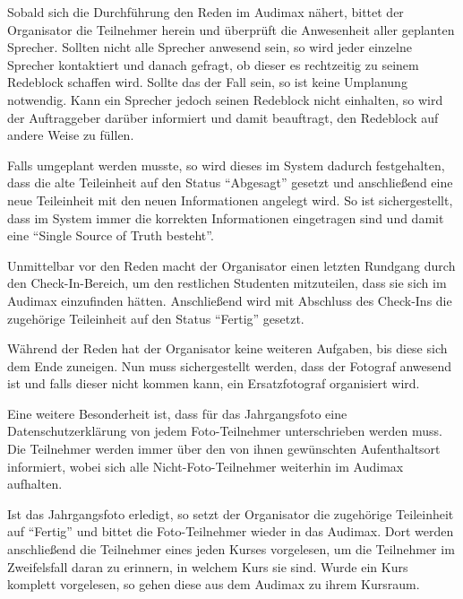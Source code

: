 

Sobald sich die Durchführung den Reden im Audimax nähert, bittet der Organisator die Teilnehmer herein und überprüft die Anwesenheit aller geplanten Sprecher. Sollten nicht alle Sprecher anwesend sein, so wird jeder einzelne Sprecher kontaktiert und danach gefragt, ob dieser es rechtzeitig zu seinem Redeblock schaffen wird. Sollte das der Fall sein, so ist keine Umplanung notwendig. Kann ein Sprecher jedoch seinen Redeblock nicht einhalten, so wird der Auftraggeber darüber informiert und damit beauftragt, den Redeblock auf andere Weise zu füllen.

Falls umgeplant werden musste, so wird dieses im System dadurch festgehalten, dass die alte Teileinheit auf den Status \enquote{Abgesagt} gesetzt und anschließend eine neue Teileinheit mit den neuen Informationen angelegt wird. So ist sichergestellt, dass im System immer die korrekten Informationen eingetragen sind und damit eine \enquote{Single Source of Truth besteht}.

Unmittelbar vor den Reden macht der Organisator einen letzten Rundgang durch den Check-In-Bereich, um den restlichen Studenten mitzuteilen, dass sie sich im Audimax einzufinden hätten. Anschließend wird mit Abschluss des Check-Ins die zugehörige Teileinheit auf den Status \enquote{Fertig} gesetzt.



Während der Reden hat der Organisator keine weiteren Aufgaben, bis diese sich dem Ende zuneigen. Nun muss sichergestellt werden, dass der Fotograf anwesend ist und falls dieser nicht kommen kann, ein Ersatzfotograf organisiert wird. 

Eine weitere Besonderheit ist, dass für das Jahrgangsfoto eine Datenschutzerklärung von jedem Foto-Teilnehmer unterschrieben werden muss. Die Teilnehmer werden immer über den von ihnen gewünschten Aufenthaltsort informiert, wobei sich alle Nicht-Foto-Teilnehmer weiterhin im Audimax aufhalten.



Ist das Jahrgangsfoto erledigt, so setzt der Organisator die zugehörige Teileinheit auf \enquote{Fertig} und bittet die Foto-Teilnehmer wieder in das Audimax. Dort werden anschließend die Teilnehmer eines jeden Kurses vorgelesen, um die Teilnehmer im Zweifelsfall daran zu erinnern, in welchem Kurs sie sind. Wurde ein Kurs komplett vorgelesen, so gehen diese aus dem Audimax zu ihrem Kursraum. 

